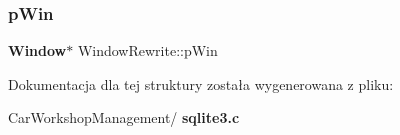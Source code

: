 \mbox{\label{struct_window_rewrite_a78a4d67508a72ddabdfe5a8e9682ceb9}} 
\subsubsection{pWin}
{\footnotesize\ttfamily \textbf{ Window}$\ast$ Window\+Rewrite\+::p\+Win}



Dokumentacja dla tej struktury została wygenerowana z pliku\+:\begin{DoxyCompactItemize}
\item 
Car\+Workshop\+Management/\textbf{ sqlite3.\+c}\end{DoxyCompactItemize}
